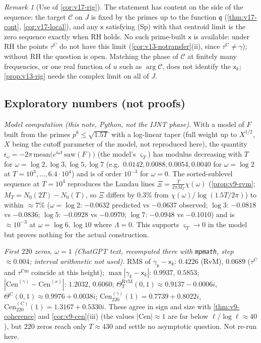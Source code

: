 \documentclass[11pt,a4paper]{article}
\numberwithin{equation}{section}
\theoremstyle{definition}
\theoremstyle{remark}
\newtheorem{remark}[theorem]{Remark}
\newcommand{\Cm}{\mathrm{Cm}}
\begin{document}
\begin{remark}[Use of \cref{cor:v17-rig}]\label{rem:v17-use}
The statement has content on the side of the sequence: the target $\mathscr C$ on $J$ is fixed by the primes up to the function $\mathfrak q$ (\cref{thm:v17-cont}, \cref{cor:v17-local}), and any $\mathsf x$ satisfying (Sp) with that centroid limit is the zero sequence exactly when RH holds. No such prime-built $\mathsf x$ is available: under RH the points $\tau^{\mathrm C}$ do not have this limit (\cref{cor:v13-notransfer}(ii), since $\tau^{\mathrm C}\ne\gamma$); without RH the question is open. Matching the phase of $\mathscr C$ at finitely many frequencies, or one real function of $u$ such as $\arg\mathscr C$, does not identify the $\mathsf x_k$; \cref{prop:v13-rig} needs the complex limit on all of $J$.
\end{remark}

\subsection{Exploratory numbers (not proofs)}\label{sec:v9-numbers}
\emph{Model computation (this note, Python, not the IJNT phase).} With a model of $F$ built from the primes $p^k\le\sqrt{1.5T}$ with a log-linear taper (full weight up to $X^{1/2}$, $X$ being the cutoff parameter of the model, not reproduced here), the quantity $\mathsf r_\omega=-2\pi\,\mathrm{mean}\bigl(e^{i\omega t}\,\mathrm{saw}(F)\bigr)$ (the model's $\varsigma_T$) has modulus decreasing with $T$ for $\omega=\log2,\log3,\log5,\log7$ (e.g.\ $0.0142,0.0088,0.0054,0.0040$ for $\omega=\log2$ at $T=10^3,\dots,6.4\cdot10^4$) and is of order $10^{-3}$ for $\omega=0$. The sorted-sublevel sequence at $T=10^4$ reproduces the Landau lines $\Xi=\frac{T}{2\pi M_T}\chi(\omega)$ (\cref{prop:v9-rvm}; $M_T=N_0(2T)-N_0(T)$, so $\Xi$ differs by $0.3\%$ from $\chi(\omega)/\log(1.5T/2\pi)$) to within $\approx7\%$ ($\omega=\log2$: $-0.0632$ predicted vs $-0.0637$ observed; $\log3$: $-0.0818$ vs $-0.0836$; $\log 5$: $-0.0928$ vs $-0.0970$; $\log 7$: $-0.0948$ vs $-0.1010$) and is $\approx10^{-3}$ at $\omega=\log6,\log10$ where $\Lambda=0$. This supports $\varsigma_T\to0$ in the model but proves nothing for the actual construction.

\emph{First $220$ zeros, $\omega=1$ (ChatGPT text, recomputed there with \texttt{mpmath}, step $\approx0.004$; interval arithmetic not used).} RMS of $\gamma_k-\mathsf x_k$: $0.4226$ (RvM), $0.0689$ ($\tau^{\mathrm C}$ and $\tau^{\Cm}$ coincide at this height); $\max|\gamma_k-\mathsf x_k|$: $0.9937$, $0.5853$; $|\mathrm{Cen}^{(\gamma)}-\mathrm{Cen}^{(x)}|$: $1.2032$, $0.6060$; $\Theta^{\mathrm{RvM}}_T(0,1)\approx0.9137-0.0006i$, $\Theta^{\mathrm C}(0,1)\approx0.9976+0.0038i$; $\mathrm{Cen}^{(\gamma)}_{220}(1)=0.7739+0.8022i$, $\mathrm{Cen}^{(\mathrm C)}_{220}(1)=1.3167+0.5330i$. These agree in sign and size with \cref{thm:v9-coherence} and \cref{cor:v9-cen}(iii) (the values $|\mathrm{Cen}|\approx1$ are far below $\ell/\log\ell\approx40$), but $220$ zeros reach only $T\approx430$ and settle no asymptotic question. Not re-run here.
\end{document}
